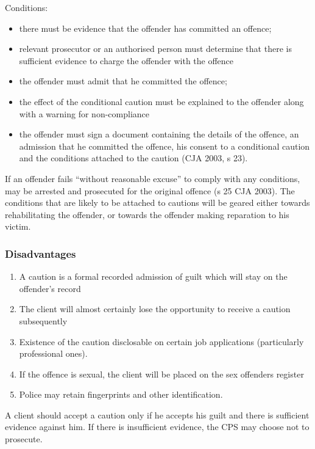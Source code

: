 \documentclass[
]{article}
\providecommand{\tightlist}{%
  \setlength{\itemsep}{0pt}\setlength{\parskip}{0pt}}
\begin{document}
Conditions:

\begin{itemize}
\tightlist
\item
  there must be evidence that the offender has committed an offence;
\item
  relevant prosecutor or an authorised person must determine that there
  is sufficient evidence to charge the offender with the offence
\item
  the offender must admit that he committed the offence;
\item
  the effect of the conditional caution must be explained to the
  offender along with a warning for non-compliance
\item
  the offender must sign a document containing the details of the
  offence, an admission that he committed the offence, his consent to a
  conditional caution and the conditions attached to the caution (CJA
  2003, s 23).
\end{itemize}

If an offender fails ``without reasonable excuse'' to comply with any
conditions, may be arrested and prosecuted for the original offence (s
25 CJA 2003). The conditions that are likely to be attached to cautions
will be geared either towards rehabilitating the offender, or towards
the offender making reparation to his victim.

\hypertarget{disadvantages}{%
\subsubsection{Disadvantages}\label{disadvantages}}

\begin{enumerate}
\def\labelenumi{\arabic{enumi}.}
\tightlist
\item
  A caution is a formal recorded admission of guilt which will stay on
  the offender's record
\item
  The client will almost certainly lose the opportunity to receive a
  caution subsequently
\item
  Existence of the caution disclosable on certain job applications
  (particularly professional ones).
\item
  If the offence is sexual, the client will be placed on the sex
  offenders register
\item
  Police may retain fingerprints and other identification.
\end{enumerate}

A client should accept a caution only if he accepts his guilt and there
is sufficient evidence against him. If there is insufficient evidence,
the CPS may choose not to prosecute.
\end{document}
